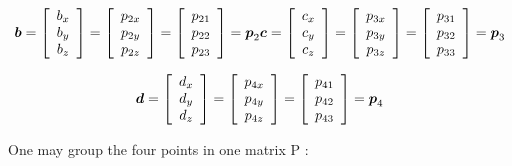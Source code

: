 \documentclass{article}
\newcommand{\bm}[1]{\mbox{\boldmath$#1$}}
\begin{document}
\[
\bm{b} = 
\left[\begin{array}{c}
 b_x \\
 b_y \\
 b_z
\end{array}\right]
=
\left[\begin{array}{c}
 p_{2x} \\
 p_{2y} \\
 p_{2z}
\end{array}\right]
=
\left[\begin{array}{c}
 p_{21} \\
 p_{22} \\
 p_{23}
\end{array}\right]
= \bm{p}_2
$$

$$
\bm{c} = 
\left[\begin{array}{c}
 c_x \\
 c_y \\
 c_z
\end{array}\right]
=
\left[\begin{array}{c}
 p_{3x} \\
 p_{3y} \\
 p_{3z}
\end{array}\right]
=
\left[\begin{array}{c}
 p_{31} \\
 p_{32} \\
 p_{33}
\end{array}\right]
= \bm{p}_3
\]

\[
\mbox{\boldmath$d$} = 
\left[\begin{array}{c}
 d_x \\
 d_y \\
 d_z
\end{array}\right]
=
\left[\begin{array}{c}
 p_{4x} \\
 p_{4y} \\
 p_{4z}
\end{array}\right]
=
\left[\begin{array}{c}
 p_{41} \\
 p_{42} \\
 p_{43}
\end{array}\right]
= \bm{p}_4
\]

One may group the four points in one matrix P :
\end{document}
